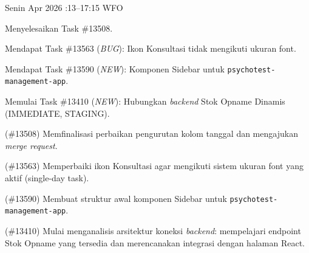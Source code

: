 \begin{logtable}
    {
        Senin  Apr 2026 :13--17:15 \linebreak %
        WFO
    }{
        \begin{loglist}
            \item Menyelesaikan Task \#13508.
            \item Mendapat Task \#13563 (\textit{BUG}): Ikon Konsultasi tidak mengikuti ukuran
            font.
            \item Mendapat Task \#13590 (\textit{NEW}): Komponen Sidebar untuk
            \texttt{psychotest-management-app}.
            \item Memulai Task \#13410 (\textit{NEW}): Hubungkan \textit{backend} Stok Opname
            Dinamis (IMMEDIATE, STAGING).
        \end{loglist}
    }{
        \begin{logwork}
            \item (\#13508) Memfinalisasi perbaikan pengurutan kolom tanggal dan mengajukan \textit{merge request}.
            \item (\#13563) Memperbaiki ikon Konsultasi agar mengikuti sistem ukuran font yang aktif (single-day task).
            \item (\#13590) Membuat struktur awal komponen Sidebar untuk \texttt{psychotest-management-app}.
            \item (\#13410) Mulai menganalisis arsitektur koneksi \textit{backend}: mempelajari endpoint Stok Opname yang tersedia dan merencanakan integrasi dengan halaman React.
        \end{logwork}
    }


\end{logtable}
